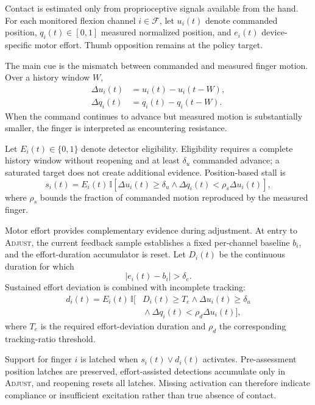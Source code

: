 \documentclass[letterpaper,10pt,conference]{ieeeconf}
\newcommand{\state}[1]{\textsc{#1}}
\begin{document}
Contact is estimated only from proprioceptive signals available from the hand.
For each monitored flexion channel $i\in\mathcal{F}$, let $u_i(t)$ denote
commanded position, $q_i(t)\in[0,1]$ measured normalized position, and $e_i(t)$
device-specific motor effort. Thumb opposition remains at the policy target.

The main cue is the mismatch between commanded and measured finger motion.
Over a history window $W$,
\begin{align}
\Delta u_i(t) &= u_i(t)-u_i(t-W),\\
\Delta q_i(t) &= q_i(t)-q_i(t-W).
\label{eq:progress}
\end{align}
When the command continues to advance but measured motion is substantially
smaller, the finger is interpreted as encountering resistance.

Let $E_i(t)\in\{0,1\}$ denote detector eligibility. Eligibility requires a
complete history window without reopening and at least $\delta_u$ commanded
advance; a saturated target does not create additional evidence. Position-based
stall is
\begin{equation}
s_i(t)=E_i(t)\,\mathbb{I}\!\left[
\Delta u_i(t)\geq\delta_u
\land
\Delta q_i(t)<\rho_s\Delta u_i(t)
\right],
\label{eq:stall}
\end{equation}
where $\rho_s$ bounds the fraction of commanded motion reproduced by the
measured finger.

Motor effort provides complementary evidence during adjustment. At entry to
\state{Adjust}, the current feedback sample establishes a fixed per-channel
baseline $b_i$, and the effort-duration accumulator is reset. Let $D_i(t)$ be
the continuous duration for which
\[
|e_i(t)-b_i|>\delta_e .
\]
Sustained effort deviation is combined with incomplete tracking:
\begin{equation}
\begin{split}
d_i(t)=E_i(t)\,\mathbb{I}\big[
&D_i(t)\geq T_e
\land \Delta u_i(t)\geq\delta_u\\
&{}\land \Delta q_i(t)<\rho_d\Delta u_i(t)
\big],
\end{split}
\label{eq:duration}
\end{equation}
where $T_e$ is the required effort-deviation duration and $\rho_d$ the
corresponding tracking-ratio threshold.

Support for finger $i$ is latched when $s_i(t)\lor d_i(t)$ activates.
Pre-assessment position latches are preserved, effort-assisted detections
accumulate only in \state{Adjust}, and reopening resets all latches. Missing
activation can therefore indicate compliance or insufficient excitation rather
than true absence of contact.
\end{document}

